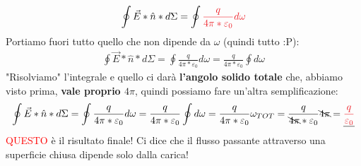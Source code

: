                     \begin{align*}
                        \oint\vec{E}*\hat{n}*d\Sigma= \oint\textcolor{Red}{\frac{q}{4\pi*\varepsilon_0}d\omega}
                    \end{align*}
                    Portiamo fuori tutto quello che non dipende da $\omega$ (quindi tutto :P):
                    \begin{align*}
                        \oint\vec{E}*\hat{n}*d\Sigma = \oint\frac{q}{4\pi*\varepsilon_0}d\omega = \frac{q}{4\pi*\varepsilon_0}\oint d\omega
                    \end{align*}
                    "Risolviamo" l'integrale e quello ci darà \textbf{l'angolo solido totale} che, abbiamo visto prima, \textbf{vale proprio $4\pi$}, quindi possiamo fare un'altra semplificazione:
                    \begin{align*}
                        \oint\vec{E}*\hat{n}*d\Sigma = \oint\frac{q}{4\pi*\varepsilon_0}d\omega = \frac{q}{4\pi*\varepsilon_0}\oint d\omega = \frac{q}{4\pi*\varepsilon_0}\omega_{TOT}=\frac{q}{\bcancel{4\pi}*\varepsilon_0}\bcancel{4\pi}=\underline{\textcolor{Red}{\frac{q}{\varepsilon_0}}}
                    \end{align*}
                    \textcolor{Red}{QUESTO} è il risultato finale! Ci dice che il flusso passante attraverso una superficie chiusa dipende solo dalla carica!

